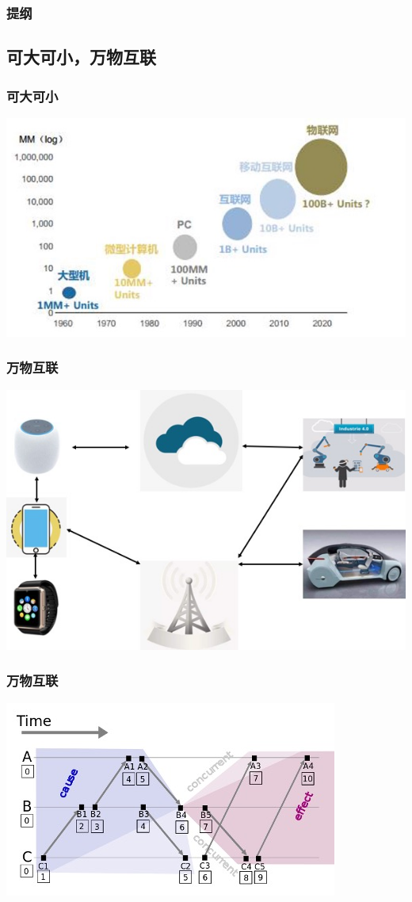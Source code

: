 \begin{frame}
\frametitle{提纲} %
\tableofcontents
\end{frame}


\subsection{可大可小，万物互联}

\begin{frame}
\frametitle{可大可小}
\centering	
\includegraphics[width=.8\textwidth]{fig23/os.jpg}
\end{frame}


\begin{frame}
\frametitle{万物互联}
\centering	
\includegraphics[width=.75\textwidth]{fig23/os2.jpg}
\end{frame}

\begin{frame}
\frametitle{万物互联}
\centering	
\includegraphics[width=.75\textwidth]{fig23/time.jpg}
\end{frame}



